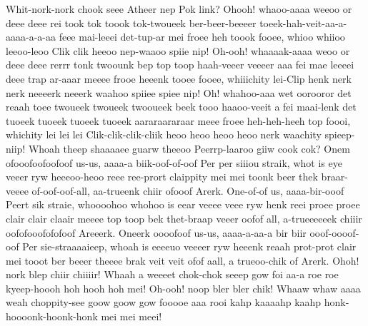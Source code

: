 \documentclass[12pt,a4paper]{article}
\begin{document}
\begin{drama}
\pistspeaks
Whit-nork-nork chook seee Atheer nep Pok link?
\euelspeaks
Ohooh! whaoo-aaaa weeoo or deee deee rei took tok toook tok-twoueek ber-beer-beeeer toeek-hah-veit-aa-a-aaaa-a-a-aa feee mai-leeei det-tup-ar mei froee heh toook fooee, whioo whiioo leeoo-leoo Clik clik heeoo nep-waaoo spiie nip! Oh-ooh! whaaaak-aaaa weoo or deee deee rerrr tonk twoounk bep top toop haah-veeer veeeer aaa fei mae leeeei deee trap ar-aaar meeee frooe heeenk tooee fooee, whiiichity lei-Clip henk nerk nerk neeeerk neeerk waahoo spiiee spiee nip! Oh! whahoo-aaa wet oorooror det reaah toee twoueek twoueek twooueek beek tooo haaoo-veeit a fei maai-lenk det tuoeek tuoeek tuoeek tuoeek aararaararaar meee froee heh-heh-heeh top foooi, whichity lei lei lei Clik-clik-clik-cliik heoo heoo heoo heoo nerk waachity spieep-niip!
\pistspeaks
Whoah theep shaaaaee guarw theeoo Peerrp-laaroo giiw cook cok?
\epopspeaks
Onem ofooofoofoofoof us-us, aaaa-a biik-oof-of-oof Per per siiiou straik, whot is eye veeer ryw heeeoo-heoo reee ree-prort claippity mei mei toonk beer thek braar-veeee of-oof-oof-all, aa-trueenk chiir ofooof Arerk. One-of-of us, aaaa-bir-ooof Peert sik straie, whoooohoo whohoo is eear veeee veee ryw henk reei proee proee clair clair claair meeee top toop bek thet-braap veeer oofof all, a-trueeeeeek chiiir oofofooofofofoof Areeerk. Oneerk oooofoof us-us, aaaa-a-aa-a bir biir ooof-oooof-oof Per sie-straaaaieep, whoah is eeeeuo veeeer ryw heeenk reaah prot-prot clair mei tooot ber beeer theeee brak veit veit ofof aall, a trueoo-chik of Arerk.
\euelspeaks
Ohoh! nork blep chiir chiiiir! Whaah a weeeet chok-chok seeep gow foi aa-a roe roe kyeep-hoooh hoh hooh hoh mei! Oh-ooh! noop bler bler chik! Whaaw whaw aaaa weah choppity-see goow goow gow fooooe aaa rooi kahp kaaaahp kaahp honk-hoooonk-hoonk-honk mei mei meei!
\pistspeaks

\end{drama}
\end{document}
